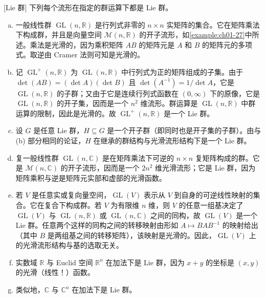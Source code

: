 \documentclass[../../main.tex]{subfiles}
\begin{document}
\begin{example}\label{example:ch07-03}[Lie 群]
下列每个流形在指定的群运算下都是 Lie 群。
\begin{enumerate}[(a)]
\item 一般线性群 $\operatorname{GL}(n,\mathbb{R})$ 是行列式非零的 $n\times n$ 实矩阵的集合。它在矩阵乘法下构成群，并且是向量空间 $\mathcal{M}(n,\mathbb{R})$ 的开子流形，如\cref{example:ch01-27}中所述。乘法是光滑的，因为乘积矩阵 $AB$ 的矩阵元是 $A$ 和 $B$ 的矩阵元的多项式。取逆由 Cramer 法则可知是光滑的。

\item 记 $\operatorname{GL}^{+}(n,\mathbb{R})$ 为 $\operatorname{GL}(n,\mathbb{R})$ 中行列式为正的矩阵组成的子集。由于 $\det(AB)=(\det A)(\det B)$ 且 $\det(A^{-1})=1/\det A$，它是 $\operatorname{GL}(n,\mathbb{R})$ 的子群；又由于它是连续行列式函数在 $(0,\infty)$ 下的原像，它是 $\operatorname{GL}(n,\mathbb{R})$ 的开子集，因而是一个 $n^2$ 维流形。群运算是 $\operatorname{GL}(n,\mathbb{R})$ 中群运算的限制，因此是光滑的。故 $\operatorname{GL}^{+}(n,\mathbb{R})$ 是一个 Lie 群。

\item 设 $G$ 是任意 Lie 群，$H\subseteq G$ 是一个开子群（即同时也是开子集的子群）。由与 (b) 部分相同的论证，$H$ 在继承的群结构与光滑流形结构下是一个 Lie 群。

\item 复一般线性群 $\operatorname{GL}(n,\mathbb{C})$ 是在矩阵乘法下可逆的 $n\times n$ 复矩阵构成的群。它是 $\mathcal{M}(n,\mathbb{C})$ 的开子流形，因而是一个 $2n^2$ 维光滑流形；它是 Lie 群，因为矩阵乘积与逆是矩阵元实部和虚部的光滑函数。

\item 若 $V$ 是任意实或复向量空间，$\operatorname{GL}(V)$ 表示从 $V$ 到自身的可逆线性映射的集合。它在复合下构成群。若 $V$ 为有限维 $n$ 维，则 $V$ 的任意一组基决定了 $\operatorname{GL}(V)$ 与 $\operatorname{GL}(n,\mathbb{R})$ 或 $\operatorname{GL}(n,\mathbb{C})$ 之间的同构，故 $\operatorname{GL}(V)$ 是一个 Lie 群。任意两个这样的同构之间的转移映射由形如 $A\mapsto BAB^{-1}$ 的映射给出（其中 $B$ 是两组基之间的转移矩阵），该映射是光滑的。因此，$\operatorname{GL}(V)$ 上的光滑流形结构与基的选取无关。

\item 实数域 $\mathbb{R}$ 与 Euclid 空间 $\mathbb{R}^n$ 在加法下是 Lie 群，因为 $x+y$ 的坐标是 $(x,y)$ 的光滑（线性！）函数。

\item 类似地，$\mathbb{C}$ 与 $\mathbb{C}^n$ 在加法下是 Lie 群。


\end{enumerate}
\end{example}
\end{document}
